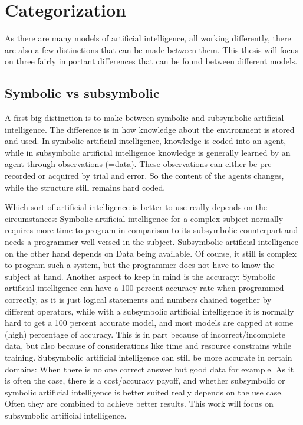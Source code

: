 \chapter{Categorization}
\label{sec:categorization}
As there are many models of artificial intelligence, all working differently, there are also a few distinctions that can be made between them. This thesis will focus on three fairly important differences that can be found between different models.
\section{Symbolic vs subsymbolic} \label{sec:categorization:symbolicvssub} \cite[This section is based on]{SymbolicVsSubsymbolic}

A first big distinction is to make between symbolic and subsymbolic artificial intelligence. 
The difference is in how knowledge about the environment is stored and used.
In symbolic artificial intelligence, knowledge is coded into an agent, while in subsymbolic artificial intelligence knowledge is generally learned by an agent through observations (=data). These observations can either be pre-recorded or acquired by trial and error. So the content of the agents changes, while the structure still remains hard coded.

Which sort of artificial intelligence is better to use really depends on the circumstances: 
Symbolic artificial intelligence for a complex subject normally requires more time to program in comparison to its subsymbolic counterpart and needs a programmer well versed in the subject. 
Subsymbolic artificial intelligence on the other hand depends on Data being available. Of course, it still is complex to program such a system, but the programmer does not have to know the subject at hand. %
Another aspect to keep in mind is the accuracy: Symbolic artificial intelligence can have a 100 percent accuracy rate when programmed correctly, as it is just logical statements and numbers chained together by different operators, while with a subsymbolic artificial intelligence it is normally hard to get a 100 percent accurate model, and most models are capped at some (high) percentage of accuracy. This is in part because of incorrect/incomplete data, but also because of considerations like time and resource constrains while training. Subsymbolic artificial intelligence can still be more accurate in certain domains: When there is no one correct answer but good data for example.
As it is often the case, there is a cost/accuracy payoff, and whether subsymbolic or symbolic artificial intelligence is better suited really depends on the use case. Often they are combined to achieve better results. This work will focus on subsymbolic artificial intelligence. 


